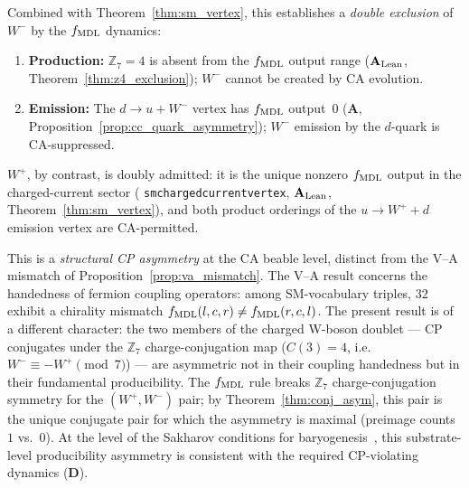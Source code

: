 \documentclass[11pt]{article}
\theoremstyle{remark}
\newcommand{\ZS}{\mathbb{Z}_7}
\newcommand{\lean}[1]{%
  \penalty-100
  \begingroup\def\_{\textunderscore\allowbreak}\texttt{#1}\endgroup}
\newcommand{\CatA}{\textbf{A}}
\newcommand{\CatAL}{\ensuremath{\textbf{A}_{\rm Lean}}}
\newcommand{\CatD}{\textbf{D}}
\begin{document}
Combined with Theorem~\ref{thm:sm_vertex}, this establishes a \emph{double exclusion}
of $W^-$ by the $f_{\rm MDL}$ dynamics:
\begin{enumerate}[nosep,leftmargin=1.5em]
\item \textbf{Production:} $\ZS = 4$ is absent from the $f_{\rm MDL}$ output range
  ($\CatAL$, Theorem~\ref{thm:z4_exclusion}); $W^-$ cannot be created by CA evolution.
\item \textbf{Emission:} The $d \to u + W^-$ vertex has $f_{\rm MDL}$ output~$0$
  ($\CatA$, Proposition~\ref{prop:cc_quark_asymmetry}); $W^-$ emission by the
  $d$-quark is CA-suppressed.
\end{enumerate}
$W^+$, by contrast, is doubly admitted: it is the unique nonzero $f_{\rm MDL}$ output in
the charged-current sector (\lean{sm\_charged\_current\_vertex}, $\CatAL$,
Theorem~\ref{thm:sm_vertex}), and both product orderings of the $u \to W^+ + d$
emission vertex are CA-permitted.

This is a \emph{structural CP asymmetry} at the CA beable level, distinct from the
V--A mismatch of Proposition~\ref{prop:va_mismatch}.
The V--A result concerns the handedness of fermion coupling operators: among
SM-vocabulary triples, $32$ exhibit a chirality mismatch
$f_{\rm MDL}(l,c,r) \neq f_{\rm MDL}(r,c,l)$.
The present result is of a different character: the two members of the charged W-boson
doublet --- CP conjugates under the $\ZS$ charge-conjugation map
($C(3) = 4$, i.e.\ $W^- \equiv -W^+ \pmod 7$) --- are asymmetric not in their
coupling handedness but in their fundamental producibility.
The $f_{\rm MDL}$ rule breaks $\ZS$ charge-conjugation symmetry for the
$(W^+, W^-)$ pair; by Theorem~\ref{thm:conj_asym}, this pair is the unique
conjugate pair for which the asymmetry is maximal (preimage counts $1$ vs.\ $0$).
At the level of the Sakharov conditions for baryogenesis~\cite{Sakharov1967}, this substrate-level
producibility asymmetry is consistent with the required CP-violating dynamics ($\CatD$).
\end{document}
